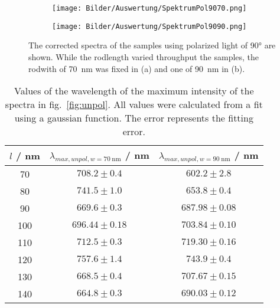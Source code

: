 \begin{figure}
    \centering
    \begin{subfigure}{\textwidth}
        \texttt{[image: Bilder/Auswertung/SpektrumPol9070.png]}
        \caption{ }
        \label{fig:90-70}
    \end{subfigure}
    \hfill
    \begin{subfigure}{\textwidth}
        \texttt{[image: Bilder/Auswertung/SpektrumPol9090.png]}
        \caption{ }
        \label{fig:90-90}
    \end{subfigure}
    \caption{The corrected spectra of the samples using polarized light of \ang{90} are shown. While the rodlength varied throughput the samples, the rodwith of \SI{70}{\nano\meter} was fixed in (a) and one of \SI{90}{\nano\meter} in (b).}
    \label{fig:pol90}
\end{figure}

\begin{table}
    \centering
    \begin{tabular}{c|cc}
        \toprule
        $l$ / \si{\nano\meter} &   $\lambda_{max,unpol,w=\SI{70}{\nano\meter}}$ / \si{\nano\meter}& $\lambda_{max,unpol,w=\SI{90}{\nano\meter}}$ / \si{\nano\meter}\\
        \midrule
        70  &  $708.2 \pm 0.4$&  $602.2 \pm 2.8$\\
        80  &  $741.5 \pm 1.0$&  $653.8 \pm 0.4$\\
        90  &  $669.6 \pm 0.3$&  $687.98 \pm 0.08$\\
        100 &  $696.44 \pm 0.18$&  $703.84 \pm 0.10$\\
        110 &  $712.5 \pm 0.3$&  $719.30 \pm 0.16$\\
        120 &  $757.6 \pm 1.4$&  $743.9 \pm 0.4$\\
        130 &  $668.5 \pm 0.4$&  $707.67 \pm 0.15$\\
        140 &  $664.8 \pm 0.3$&  $690.03 \pm 0.12$\\
        \bottomrule
    \end{tabular}
    \caption{Values of the wavelength of the maximum intensity of the spectra in fig.~\ref{fig:unpol}. All values were calculated from a fit using a gaussian function. The error represents the fitting error.}
    \label{tab:lamMaxUn}
\end{table}

